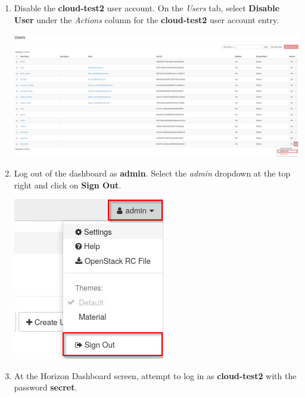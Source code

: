 \documentclass[letterpaper, 12pt]{article}
\begin{document}
\begin{enumerate}
    \item Disable the \textbf{cloud-test2} user account. On the \textit{Users} tab, select \textbf{Disable User} under
    the \textit{Actions} column for the \textbf{cloud-test2} user account entry.

    \begin{center}
        \includegraphics[width=\linewidth]{images/part3/step7.png}
    \end{center}

    \item Log out of the dashboard as \textbf{admin}. Select the \textit{admin} dropdown at the top right and click on
    \textbf{Sign Out}.

    \begin{center}
        \includegraphics[scale=0.75]{images/part3/step8.png}
    \end{center}

    \item At the Horizon Dashboard screen, attempt to log in as \textbf{cloud-test2} with the password \textbf{secret}.
    

\end{enumerate}
\end{document}
